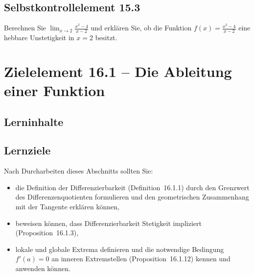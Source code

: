 \documentclass[a4paper,12pt]{article}
\begin{document}
\subsection*{Selbstkontrollelement 15.3}

Berechnen Sie $\displaystyle\lim_{x \to 2} \frac{x^2 - 4}{x - 2}$ und erklären
Sie, ob die Funktion $f(x) = \frac{x^2-4}{x-2}$ eine hebbare Unstetigkeit in
$x = 2$ besitzt.

\newpage

\section*{Zielelement 16.1 -- Die Ableitung einer Funktion}

\subsection*{Lerninhalte}

\begin{center}
\end{center}

\subsection*{Lernziele}

Nach Durcharbeiten dieses Abschnitts sollten Sie:
\begin{itemize}
  \item die Definition der Differenzierbarkeit (Definition~16.1.1) durch den
        Grenzwert des Differenzenquotienten formulieren und den geometrischen
        Zusammenhang mit der Tangente erklären können,
  \item beweisen können, dass Differenzierbarkeit Stetigkeit impliziert
        (Proposition~16.1.3),
  \item lokale und globale Extrema definieren und die notwendige Bedingung
        $f'(a) = 0$ an inneren Extremstellen (Proposition~16.1.12) kennen und
        anwenden können.
\end{itemize}
\end{document}
